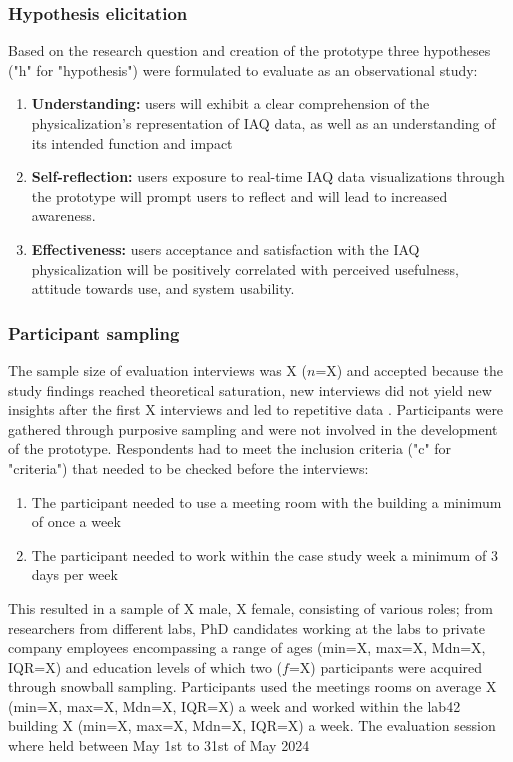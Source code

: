 \subsubsection{Hypothesis elicitation}

Based on the research question and creation of the prototype three hypotheses ("h" for "hypothesis") were formulated to evaluate as an observational study:

\begin{enumerate}
    \renewcommand{\labelenumi}{H\arabic{enumi}:}
    \item \textbf{Understanding:} users will exhibit a clear comprehension of the physicalization's representation of IAQ data, as well as an understanding of its intended function and impact
    \item \textbf{Self-reflection:} users exposure to real-time IAQ data visualizations through the prototype will prompt users to reflect and will lead to increased awareness.
    \item \textbf{Effectiveness:} users acceptance and satisfaction with the IAQ physicalization will be positively correlated with perceived usefulness, attitude towards use, and system usability.
\end{enumerate}

\subsubsection{Participant sampling}

The sample size of evaluation interviews was X ($n$=X) and accepted because the study findings reached theoretical saturation, new interviews did not yield new insights after the first X interviews and led to repetitive data \cite{steph_menken_introduction_2016}. Participants were gathered through purposive sampling and were not involved in the development of the prototype. Respondents had to meet the inclusion criteria ("c" for "criteria") that needed to be checked before the interviews: 

\begin{enumerate}
    \renewcommand{\labelenumi}{C\arabic{enumi}:}
    \item The participant needed to use a meeting room with the building a minimum of once a week
    \item The participant needed to work within the case study week a minimum of 3 days per week
\end{enumerate}

This resulted in a sample of X male, X female, consisting of various roles; from researchers from different labs, PhD candidates working at the labs to private company employees encompassing a range of ages (min=X, max=X, Mdn=X, IQR=X) and education levels of which two ($f$=X) participants were acquired through snowball sampling. Participants used the meetings rooms on average X (min=X, max=X, Mdn=X, IQR=X) a week and worked within the lab42 building X (min=X, max=X, Mdn=X, IQR=X) a week. The evaluation session where held between May 1st to 31st of May 2024

